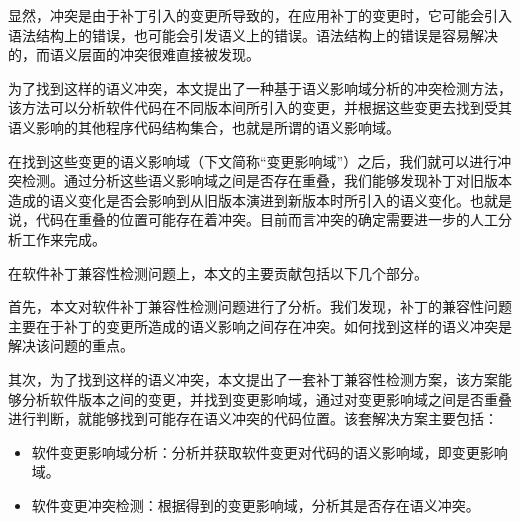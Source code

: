 %

显然，冲突是由于补丁引入的变更所导致的，在应用补丁的变更时，它可能会引入语法结构上的错误，也可能会引发语义上的错误。语法结构上的错误是容易解决的，而语义层面的冲突很难直接被发现。

为了找到这样的语义冲突，本文提出了一种基于语义影响域分析的冲突检测方法，该方法可以分析软件代码在不同版本间所引入的变更，并根据这些变更去找到受其语义影响的其他程序代码结构集合，也就是所谓的语义影响域。

在找到这些变更的语义影响域（下文简称“变更影响域”）之后，我们就可以进行冲突检测。通过分析这些语义影响域之间是否存在重叠，我们能够发现补丁对旧版本造成的语义变化是否会影响到从旧版本演进到新版本时所引入的语义变化。也就是说，代码在重叠的位置可能存在着冲突。目前而言冲突的确定需要进一步的人工分析工作来完成。

在软件补丁兼容性检测问题上，本文的主要贡献包括以下几个部分。

首先，本文对软件补丁兼容性检测问题进行了分析。我们发现，补丁的兼容性问题主要在于补丁的变更所造成的语义影响之间存在冲突。如何找到这样的语义冲突是解决该问题的重点。

其次，为了找到这样的语义冲突，本文提出了一套补丁兼容性检测方案，该方案能够分析软件版本之间的变更，并找到变更影响域，通过对变更影响域之间是否重叠进行判断，就能够找到可能存在语义冲突的代码位置。该套解决方案主要包括：
	\begin{itemize}
		\item 软件变更影响域分析：分析并获取软件变更对代码的语义影响域，即变更影响域。
		\item 软件变更冲突检测：根据得到的变更影响域，分析其是否存在语义冲突。
	\end{itemize}
	
